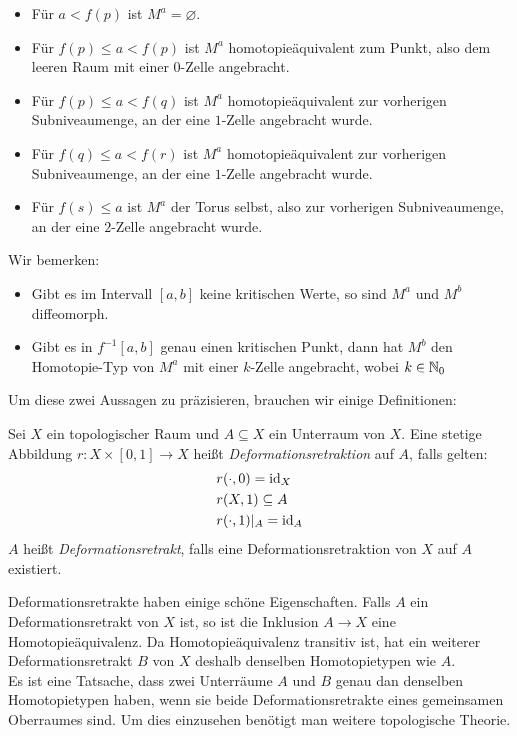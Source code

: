 \begin{itemize}
    \item Für $a < f(p)$ ist $M^a = \varnothing$.
    \item Für $f(p) \leq a < f(p)$ ist $M^a$ homotopieäquivalent zum Punkt,
        also dem leeren Raum mit einer $0$-Zelle angebracht.
    \item Für $f(p) \leq a < f(q)$ ist $M^a$ homotopieäquivalent zur vorherigen
        Subniveaumenge, an der eine $1$-Zelle angebracht wurde.
    \item Für $f(q) \leq a < f(r)$ ist $M^a$ homotopieäquivalent zur vorherigen
        Subniveaumenge, an der eine $1$-Zelle angebracht wurde.
    \item Für $f(s) \leq a$ ist $M^a$ der Torus selbst, also zur vorherigen 
        Subniveaumenge, an der eine $2$-Zelle angebracht wurde.
\end{itemize}

Wir bemerken: 
\begin{itemize}
    \item Gibt es im Intervall $[a, b]$ keine kritischen Werte, so sind $M^a$ und
        $M^b$ diffeomorph.
    \item Gibt es in $f^{-1}[a, b]$ genau einen kritischen Punkt, dann hat $M^b$ 
        den Homotopie-Typ von $M^a$ mit einer $k$-Zelle angebracht, wobei 
        $k \in { \mathbb N }_0$
\end{itemize}

Um diese zwei Aussagen zu präzisieren, brauchen wir einige Definitionen:

\begin{definition}[Deformationsretrakt]
    Sei $X$ ein topologischer Raum und $A \subseteq X$ ein Unterraum von $X$.
    Eine stetige Abbildung $r: X \times [0, 1] \rightarrow X$ heißt 
    \textit{Deformationsretraktion} auf $A$, falls gelten:
    \begin{align*}
        & r(\cdot, 0) = { \operatorname{id} }_X \\
        & r(X, 1) \subseteq A \\
        & r(\cdot, 1)|_A = { \operatorname{id} }_A \\
    \end{align*}
    $A$ heißt \textit{Deformationsretrakt}, falls eine Deformationsretraktion
    von $X$ auf $A$ existiert.
\end{definition}

Deformationsretrakte haben einige schöne Eigenschaften. Falls $A$ ein
Deformationsretrakt von $X$ ist, so ist die Inklusion $A \rightarrow X$ eine
Homotopieäquivalenz. Da Homotopieäquivalenz transitiv ist, hat ein weiterer
Deformationsretrakt $B$ von $X$ deshalb denselben Homotopietypen wie $A$. \\
Es ist eine Tatsache, dass zwei Unterräume $A$ und $B$ genau dan denselben 
Homotopietypen haben, wenn sie beide Deformationsretrakte eines gemeinsamen 
Oberraumes sind. Um dies einzusehen benötigt man weitere topologische 
Theorie.
